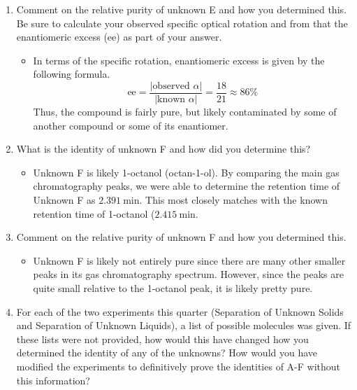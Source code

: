 \documentclass[titlepage]{article}
\begin{document}
\begin{enumerate}
    \item Comment on the relative purity of unknown E and how you determined this. Be sure to calculate your observed specific optical rotation and from that the enantiomeric excess (ee) as part of your answer.
    \begin{itemize}
        \item In terms of the specific rotation, enantiomeric excess is given by the following formula.
        \begin{equation*}
            \text{ee} = \frac{|\text{observed }\alpha|}{|\text{known }\alpha|} = \frac{18}{21} \approx 86\%
        \end{equation*}
        Thus, the compound is fairly pure, but likely contaminated by some of another compound or some of its enantiomer.
    \end{itemize}
    \item What is the identity of unknown F and how did you determine this?
    \begin{center}
        \footnotesize
    \end{center}
    \begin{itemize}
        \item Unknown F is likely 1-octanol (octan-1-ol). By comparing the main gas chromatography peaks, we were able to determine the retention time of Unknown F as $\SI{2.391}{\minute}$. This most closely matches with the known retention time of 1-octanol ($\SI{2.415}{\minute}$.
    \end{itemize}
    \item Comment on the relative purity of unknown F and how you determined this.
    \begin{itemize}
        \item Unknown F is likely not entirely pure since there are many other smaller peaks in its gas chromatography spectrum. However, since the peaks are quite small relative to the 1-octanol peak, it is likely pretty pure.
    \end{itemize}
    \item For each of the two experiments this quarter (Separation of Unknown Solids and Separation of Unknown Liquids), a list of possible molecules was given. If these lists were not provided, how would this have changed how you determined the identity of any of the unknowns? How would you have modified the experiments to definitively prove the identities of A-F without this information?
    \begin{itemize}

\end{itemize}
\end{enumerate}
\end{document}
